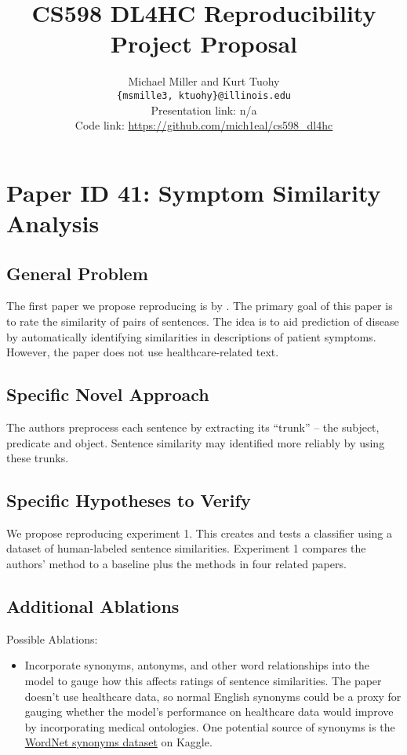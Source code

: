 \documentclass[11pt,a4paper]{article}
\title{CS598 DL4HC Reproducibility Project Proposal}
\author{Michael Miller and Kurt Tuohy \\
  \texttt{\{msmille3, ktuohy\}@illinois.edu}
  \\[2em]
  Presentation link: n/a\url{} \\
  Code link: \url{https://github.com/mich1eal/cs598_dl4hc}}
\begin{document}
\maketitle


\section{Paper ID 41: Symptom Similarity Analysis}
\subsection{General Problem}
The first paper we propose reproducing is \citet{zhang_2019} by \citeauthor*{zhang_2019}. The primary goal of this paper is to rate the similarity of pairs of sentences. The idea is to aid prediction of disease by automatically identifying similarities in descriptions of patient symptoms. However, the paper does not use healthcare-related text.

\citet{zhang_2019} 







\subsection{Specific Novel Approach}
The authors preprocess each sentence by extracting its ``trunk'' -- the subject, predicate and object. Sentence similarity may identified more reliably by using these trunks.

\subsection{Specific Hypotheses to Verify}
We propose reproducing experiment 1. This creates and tests a classifier using a dataset of human-labeled sentence similarities. Experiment 1 compares the authors' method to a baseline plus the methods in four related papers.

\subsection{Additional Ablations}
Possible Ablations:
\begin{itemize}
  \item Incorporate synonyms, antonyms, and other word relationships into the model to gauge how this affects ratings of sentence similarities. The paper doesn't use healthcare data, so normal English synonyms could be a proxy for gauging whether the model's performance on healthcare data would improve by incorporating medical ontologies. One potential source of synonyms is the \href{https://www.kaggle.com/datasets/duketemon/wordnet-synonyms}{WordNet synonyms dataset} on Kaggle.
\end{itemize}
\end{document}
